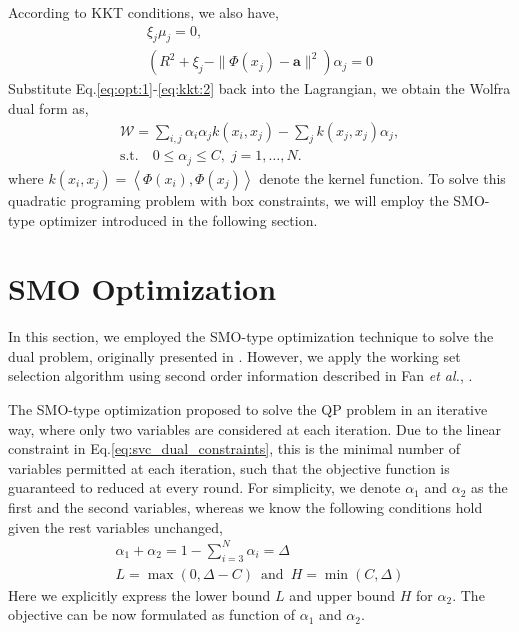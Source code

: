 \documentclass{llncs}
\newcommand{\etal}{\emph{et al.}}
\begin{document}
According to KKT conditions, we also have,
\begin{align}
	\xi_j\mu_j=0, \label{eq:kkt:1} \\ 
	\left(R^2+\xi_j-\|\Phi(x_j)-\mathbf{a}\|^2\right)\alpha_j=0 \label{eq:kkt:2}
\end{align}
Substitute Eq.\eqref{eq:opt:1}-\eqref{eq:kkt:2} back into the Lagrangian, we obtain the Wolfra dual form as,
\begin{align}
	\mathcal{W}=\sum_{i,j}\alpha_i\alpha_j k(x_i,x_j) - \sum_jk(x_j,x_j)\alpha_j,  \label{eq:svc_dual_obj} \\
	\text{s.t.}\quad 0\leq\alpha_j\leq C, \; j=1,\ldots,N. \label{eq:svc_dual_constraints}
\end{align}
where $k(x_i, x_j) = \left\langle \Phi(x_i), \Phi(x_j) \right\rangle$ denote the kernel function. To solve this quadratic programing problem with box constraints, we will employ the SMO-type optimizer introduced in the following section. 

\section{SMO Optimization}
In this section, we employed the SMO-type optimization technique to solve the dual problem, originally presented in \cite{platt99}. However, we apply the working set selection algorithm using second order information described in Fan \etal, \cite{fan05jmrl}. 

The SMO-type optimization proposed to solve the QP problem in an iterative way, where only two variables are considered at each iteration. Due to the linear constraint in Eq.\eqref{eq:svc_dual_constraints}, this is the minimal number of variables permitted at each iteration, such that the objective function is guaranteed to reduced at every round. For simplicity, we denote $\alpha_1$ and $\alpha_2$ as the first and the second variables, whereas we know the following conditions hold given the rest variables unchanged, 
\begin{eqnarray}
\alpha_1 + \alpha_2 = 1 - \sum_{i=3}^N \alpha_i = \Delta \\
L = \max(0, \Delta - C) \,\text{ and }\, H = \min(C, \Delta)
\end{eqnarray}
Here we explicitly express the lower bound $L$ and upper bound $H$ for $\alpha_2$. The objective can be now formulated as function of $\alpha_1$ and $\alpha_2$.
\end{document}
